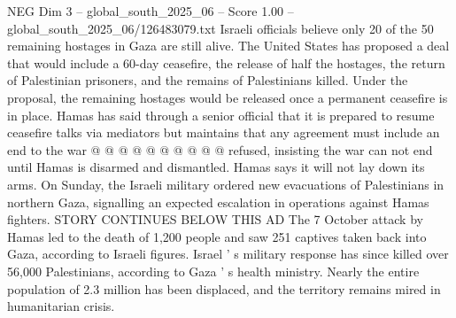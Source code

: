 \begin{textsample}{NEG Dim 3 – global\_south\_2025\_06 – Score 1.00 – global\_south\_2025\_06/126483079.txt}
Israeli officials believe only 20 of the 50 remaining hostages in Gaza are still alive.
The United States has proposed a deal that would include a 60-day ceasefire, the release of half the hostages, the return of Palestinian prisoners, and the remains of Palestinians killed.
Under the proposal, the remaining hostages would be released once a permanent ceasefire is in place.
Hamas has said through a senior official that it is prepared to resume ceasefire talks via mediators but maintains that any agreement must include an end to the war @ @ @ @ @ @ @ @ @ @ refused, insisting the war can not end until Hamas is disarmed and dismantled.
Hamas says it will not lay down its arms.
On Sunday, the Israeli military ordered new evacuations of Palestinians in northern Gaza, signalling an expected escalation in operations against Hamas fighters.
STORY CONTINUES BELOW THIS AD The 7 October attack by Hamas led to the death of 1,200 people and saw 251 captives taken back into Gaza, according to Israeli figures.
Israel ' s military response has since killed over 56,000 Palestinians, according to Gaza ' s health ministry.
Nearly the entire population of 2.3 million has been displaced, and the territory remains mired in humanitarian crisis.

\end{textsample}
